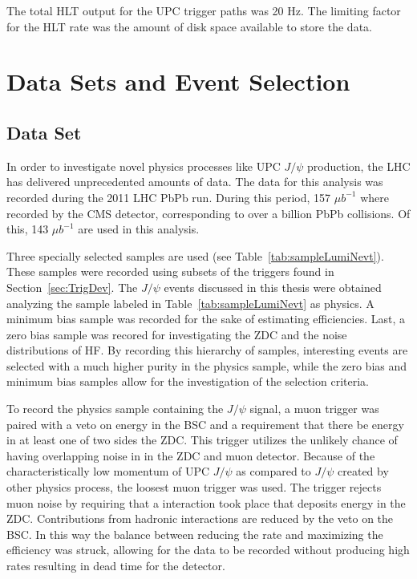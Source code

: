 	The total HLT output for the UPC trigger paths was 20 Hz. 
	The limiting factor for the HLT rate was the amount of disk space 
	  available to store the data. 

  \section{\label{sec:DataSetEvSel} Data Sets and Event Selection}
    \subsection{Data Set}
      In order to investigate novel physics processes like UPC $J/\psi$ 
       production, the LHC has delivered unprecedented amounts of data.
      The data for this analysis was recorded during the 2011 LHC PbPb run. 
      During this period, 157 $\mu$$b^{-1}$ where recorded by the CMS detector,
        corresponding to over a billion PbPb collisions. 
      Of this, 143 $\mu$$b^{-1}$ are used in this analysis.
  
      Three specially selected samples are used (see Table~\ref{tab:sampleLumiNevt}).
      These samples were recorded using subsets of the triggers found in 
        Section~\ref{sec:TrigDev}.
      The $J/\psi$ events discussed in this thesis were obtained analyzing the 
      sample labeled in Table~\ref{tab:sampleLumiNevt} as physics.
      A minimum bias sample was recorded for the sake of estimating efficiencies.
      Last, a zero bias sample was recored for investigating the ZDC and the 
        noise distributions of HF.
      By recording this hierarchy of samples, interesting events are selected 
        with a much higher purity in the physics sample, while the zero bias and 
        minimum bias samples allow for the investigation of the selection 
        criteria. 
  
      To record the physics sample containing the $J/\psi$ signal, a muon trigger
        was paired with a veto on energy in the BSC and a requirement that there 
        be energy in at least one of two sides the ZDC. 
      This trigger utilizes the unlikely chance of having overlapping noise in
        in the ZDC and muon detector.
      Because of the characteristically low momentum of UPC $J/\psi$ as compared
        to $J/\psi$ created by other physics process, the loosest muon 
        trigger was used.
      The trigger rejects muon noise by requiring that a interaction took place
        that deposits energy in the ZDC.
      Contributions from hadronic interactions are reduced by the veto on the 
        BSC.
      In this way the balance between reducing the rate and maximizing the 
        efficiency was struck, allowing for the data to be recorded without 
        producing high rates resulting in dead time for the detector.  
      
